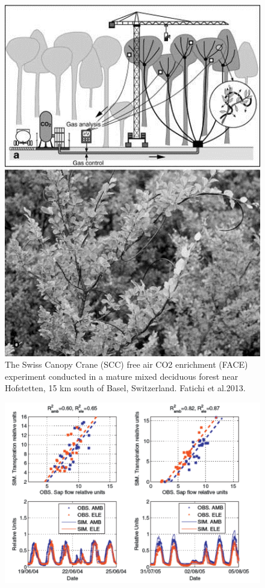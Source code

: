 \documentclass[12pt,oneside]{book}
\begin{document}
\begin{figure}

{\centering \includegraphics[width=0.8\linewidth]{figures/chap5/f510_face} 

}

\caption{The Swiss Canopy Crane (SCC) free air CO2 enrichment (FACE) experiment  conducted in a mature mixed deciduous forest near Hofstetten, 15 km south of Basel, Switzerland. Fatichi et al.2013. }\label{fig:f510}
\end{figure}\begin{figure}

{\centering \includegraphics[width=0.8\linewidth]{figures/chap5/f511_fatichi_sf} 

}
\end{figure}
\end{document}
